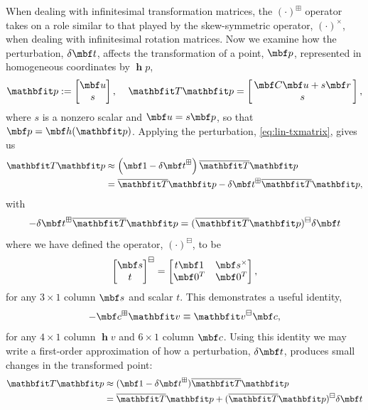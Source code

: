 \documentclass[11pt,a4,oneside]{article}
\begin{document}
When dealing with infinitesimal transformation matrices, the $(\cdot)^\boxplus$ operator takes on a role similar to that played by the skew-symmetric operator, $(\cdot)^\times$, when dealing with infinitesimal rotation matrices.
Now we examine how the perturbation, $\mbfdel t$, affects the transformation of a point, $\mbf p$, represented in homogeneous coordinates by $\mbfh p$,
\begin{equation}
	\mbfh p := 
		\bbm 
			\mbf u \\ 
                        s 
		\ebm,\;\;\;\;
	\mbfh T \mbfh p = 
		\bbm
			\,\mbf C \mbf u + s \mbf r\,\\
			s
		\ebm,
\end{equation}
where $s$ is a nonzero scalar and $\mbf u = s \mbf p$, so that $\mbf p = \mbf h(\mbfh p)$. Applying the perturbation, \eqref{eq:lin-txmatrix}, gives us
\begin{subequations}
  \begin{flalign}
    \mbfh T \mbfh p & \approx 
	\left ( 
		\mbf 1
		-
		\mbfdel t^\boxplus
	\right) 
	\mbfhbar T 
	\mbfh p \\
        &= \mbfhbar T \mbfh p  - \mbfdel t^\boxplus \mbfhbar T\mbfh p,
  \end{flalign}
\end{subequations}
with
\begin{equation}
- \mbfdel t^\boxplus \mbfhbar T \mbfh p =  (\mbfhbar T \mbfh p)^\boxminus \mbfdel t \label{eq:proveSwap} 
\end{equation}
where we have defined the operator, $(\cdot)^\boxminus$, to be
\begin{equation}
	 \bbm \mbf s\\ t \ebm^\boxminus = 
		\bbm
			  t\mbf 1   & \mbf s^\times\\
			  \mbf 0^T & \mbf 0^T    
		\ebm,
\end{equation}
for any $3 \times 1$ column $\mbf s$ and scalar $t$. This demonstrates a useful identity,
\begin{equation}
  \label{eq:lintran-plusminus}
  {-\mbf c^\boxplus \mbfh v \equiv \mbfh v^\boxminus \mbf c},
\end{equation}
for any $4 \times 1$ column $\mbfh v$ and $6 \times 1$ column $\mbf c$.
Using this identity we may write a first-order approximation of how a perturbation, $\mbfdel t$, produces small changes in the transformed point:
\begin{subequations}
\begin{flalign}
	\mbfh T \mbfh p & \approx (\mbf 1 - \mbfdel t^\boxplus) \mbfhbar T \mbfh p\\
        &= \mbfhbar T \mbfh p +
			(\mbfhbar T \mbfh p)^\boxminus
			\mbfdel t \label{eq:linTx}
\end{flalign}
\end{subequations}
\end{document}
